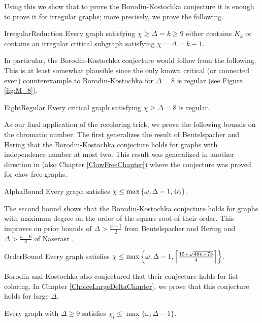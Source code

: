 Using this we show that to prove the Borodin-Kostochka conjecture it is enough
to prove it for irregular graphs; more precisely, we prove the following.

\begin{repthm}{IrregularReduction}
Every graph satisfying $\chi \geq \Delta = k \geq 9$ either
contains $K_k$ or contains an irregular critical subgraph satisfying $\chi
= \Delta = k - 1$.
\end{repthm}

In particular, the Borodin-Kostochka conjecture would follow from the following.
This is at least somewhat plausible since the only known critical (or connected
even) counterexample to Borodin-Kostochka for $\Delta = 8$ is regular (see
Figure \ref{fig:M_8}).

\begin{repconjecture}{EightRegular}
Every critical graph satisfying $\chi \geq \Delta = 8$ is regular.
\end{repconjecture}

As our final application of the recoloring trick, we prove the following bounds on the chromatic number.  The first generalizes the result of Beutelspacher and Hering \cite{beutelspacher1984minimal} that the Borodin-Kostochka conjecture holds for graphs with independence number at most two.  This result was generalized in another direction in \cite{cranstonrabernclaw} (also Chapter \ref{ClawFreeChapter}) where the conjecture was proved for claw-free graphs.

\begin{repthm}{AlphaBound}
Every graph satisfies $\chi \leq \max\left\{ \omega, \Delta - 1, 4\alpha \right\}$.
\end{repthm}

The second bound shows that the Borodin-Kostochka conjecture holds for graphs with maximum degree on the order of the square root of their order.  This improves on prior bounds of $\Delta > \frac{n + 1}{2}$ from Beutelspacher and Hering \cite{beutelspacher1984minimal} and $\Delta > \frac{n-6}{3}$ of Naserasr \cite{naserasr}.

\begin{repthm}{OrderBound}
Every graph satisfies $\chi \leq \max\left\{ \omega, \Delta - 1, \left\lceil\frac{15 + \sqrt{48n + 73}}{4}\right\rceil \right\}$.
\end{repthm}

Borodin and Kostochka also conjectured \cite{PersonalComms} that
their conjecture holds for list coloring. In Chapter \ref{ChoiceLargeDeltaChapter}, we prove that this conjecture holds for large $\Delta$.

\begin{conjecture}\label{BKList}
Every graph with $\Delta \geq 9$ satisfies $\chi_l \leq \max\{\omega, \Delta -
1\}$.
\end{conjecture}


